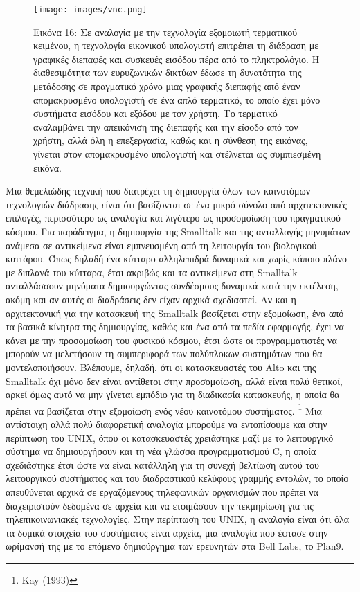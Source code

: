 \documentclass[
]{article}
\begin{document}
\leavevmode{}%
\begin{figure}
\hypertarget{fig:vnc}{%
\centering
\texttt{[image: images/vnc.png]}
\caption{Εικόνα 16: Σε αναλογία με την τεχνολογία εξομοιωτή τερματικού
κειμένου, η τεχνολογία εικονικού υπολογιστή επιτρέπει τη διάδραση με
γραφικές διεπαφές και συσκευές εισόδου πέρα από το πληκτρολόγιο. Η
διαθεσιμότητα των ευρυζωνικών δικτύων έδωσε τη δυνατότητα της μετάδοσης
σε πραγματικό χρόνο μιας γραφικής διεπαφής από έναν απομακρυσμένο
υπολογιστή σε ένα απλό τερματικό, το οποίο έχει μόνο συστήματα εισόδου
και εξόδου με τον χρήστη. Το τερματικό αναλαμβάνει την απεικόνιση της
διεπαφής και την είσοδο από τον χρήστη, αλλά όλη η επεξεργασία, καθώς
και η σύνθεση της εικόνας, γίνεται στον απομακρυσμένο υπολογιστή και
στέλνεται ως συμπιεσμένη εικόνα.}\label{fig:vnc}
}
\end{figure}

Μια θεμελιώδης τεχνική που διατρέχει τη δημιουργία όλων των καινοτόμων
τεχνολογιών διάδρασης είναι ότι βασίζονται σε ένα μικρό σύνολο από
αρχιτεκτονικές επιλογές, περισσότερο ως αναλογία και λιγότερο ως
προσομοίωση του πραγματικού κόσμου. Για παράδειγμα, η δημιουργία της
Smalltalk και της ανταλλαγής μηνυμάτων ανάμεσα σε αντικείμενα είναι
εμπνευσμένη από τη λειτουργία του βιολογικού κυττάρου. Όπως δηλαδή ένα
κύτταρο αλληλεπιδρά δυναμικά και χωρίς κάποιο πλάνο με διπλανά του
κύτταρα, έτσι ακριβώς και τα αντικείμενα στη Smalltalk ανταλλάσσουν
μηνύματα δημιουργώντας συνδέσμους δυναμικά κατά την εκτέλεση, ακόμη και
αν αυτές οι διαδράσεις δεν είχαν αρχικά σχεδιαστεί. Αν και η
αρχιτεκτονική για την κατασκευή της Smalltalk βασίζεται στην εξομοίωση,
ένα από τα βασικά κίνητρα της δημιουργίας, καθώς και ένα από τα πεδία
εφαρμογής, έχει να κάνει με την προσομοίωση του φυσικού κόσμου, έτσι
ώστε οι προγραμματιστές να μπορούν να μελετήσουν τη συμπεριφορά των
πολύπλοκων συστημάτων που θα μοντελοποιήσουν. Βλέπουμε, δηλαδή, ότι οι
κατασκευαστές του Alto και της Smalltalk όχι μόνο δεν είναι αντίθετοι
στην προσομοίωση, αλλά είναι πολύ θετικοί, αρκεί όμως αυτό να μην
γίνεται εμπόδιο για τη διαδικασία κατασκευής, η οποία θα πρέπει να
βασίζεται στην εξομοίωση ενός νέου καινοτόμου συστήματος. \footnote{Kay
  (1993)} Μια αντίστοιχη αλλά πολύ διαφορετική αναλογία μπορούμε να
εντοπίσουμε και στην περίπτωση του UNIX, όπου οι κατασκευαστές
χρειάστηκε μαζί με το λειτουργικό σύστημα να δημιουργήσουν και τη νέα
γλώσσα προγραμματισμού C, η οποία σχεδιάστηκε έτσι ώστε να είναι
κατάλληλη για τη συνεχή βελτίωση αυτού του λειτουργικού συστήματος και
του διαδραστικού κελύφους γραμμής εντολών, το οποίο απευθύνεται αρχικά
σε εργαζόμενους τηλεφωνικών οργανισμών που πρέπει να διαχειριστούν
δεδομένα σε αρχεία και να ετοιμάσουν την τεκμηρίωση για τις
τηλεπικοινωνιακές τεχνολογίες. Στην περίπτωση του UNIX, η αναλογία είναι
ότι όλα τα δομικά στοιχεία του συστήματος είναι αρχεία, μια αναλογία που
έφτασε στην ωρίμανσή της με το επόμενο δημιούργημα των ερευνητών στα
Bell Labs, το Plan9.
\end{document}
